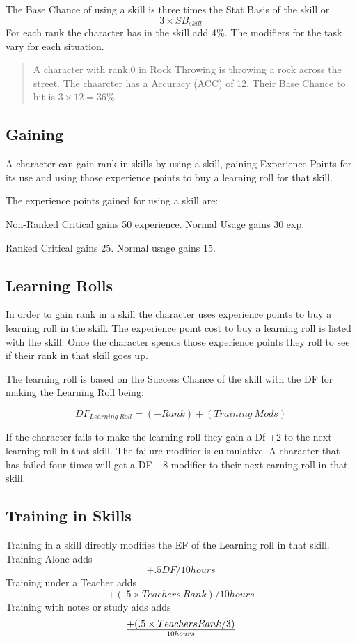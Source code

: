 The Base Chance of using a skill is three times the Stat Basis of the skill
or \[ 3 \times SB_{skill} \] For each rank the character has in the skill add 4\%.
The modifiers for the task vary for each situation.

\begin{quote}
A character with rank:0 in Rock Throwing is throwing a rock 
across the street. The chaarcter has a Accuracy (ACC) of 12. Their Base Chance 
to hit is \( 3 \times 12 = 36\% \).
\end{quote}

\subsection{Gaining}
A character can gain rank in skills by using a skill, gaining Experience Points
for its use and using those experience points to buy a learning roll for that
skill. 

The experience points gained for using a skill are:

\begin{relate}
	\item[Non-Ranked] Critical gains 50 experience. Normal Usage gains 30 exp.
	\item[Ranked] Critical gains 25. Normal usage gains 15.
\end{relate}

\subsection{Learning Rolls}

In order to gain rank in a skill the character uses experience points to
buy a learning roll in the skill. The experience point cost to buy a learning roll
is listed with the skill. Once the character spends
those experience points they roll to see if their rank in that
skill goes up.

The learning roll is based on the Success Chance of the skill with the  
DF for making the Learning Roll being: 

\[DF_{Learning\ Roll} = (-Rank) + ({Training\ Mods})\]

If the character fails to make the learning roll they gain a Df +2 to the next 
learning roll in that skill. The failure modifier is culmulative. A character
that has failed four times will get a DF +8 modifier to their next earning roll
in that skill.

\subsection{Training in Skills}

{Training} in a skill directly modifies the EF of the Learning roll in
that skill. Training Alone adds \[+.5 DF/10 hours\] 
Training under a Teacher adds \[+(.5 \times {Teachers\ Rank})/10 hours\]
Training with notes or study aids adds \[+(.5 \times {Teachers Rank}/3) \over {10 hours}\]

